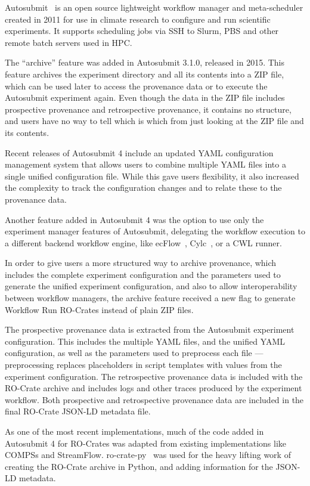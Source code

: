\documentclass[10pt,letterpaper]{article}
\begin{document}
Autosubmit~\cite{Manubens-Gil 2016} is an open source lightweight workflow manager and meta-scheduler created in 2011 for use in climate research to configure and run scientific experiments.
It supports scheduling jobs via SSH to Slurm, PBS and other remote batch servers used in HPC.

The ``archive'' feature was added in Autosubmit 3.1.0, released in 2015.
This feature archives the experiment directory and all its contents into a ZIP file, which can be used later to access the provenance data or to execute the Autosubmit experiment again.
Even though the data in the ZIP file includes prospective provenance and retrospective provenance, it contains no structure, and users have no way to tell which is which from just looking at the ZIP file and its contents.

Recent releases of Autosubmit 4 include an updated YAML configuration management system that allows users to combine multiple YAML files into a single unified configuration file.
While this gave users flexibility, it also increased the complexity to track the configuration changes and to relate these to the provenance data.

Another feature added in Autosubmit 4 was the option to use only the experiment manager features of Autosubmit, delegating the workflow execution to a different backend workflow engine, like ecFlow~\cite{Bahra 2011}, Cylc~\cite{Oliver 2023}, or a CWL runner.

In order to give users a more structured way to archive provenance, which includes the complete experiment configuration and the parameters used to generate the unified experiment configuration, and also to allow interoperability between workflow managers, the archive feature received a new flag to generate Workflow Run RO-Crates instead of plain ZIP files.

The prospective provenance data is extracted from the Autosubmit experiment configuration.
This includes the multiple YAML files, and the unified YAML configuration, as well as the parameters used to preprocess each file --- preprocessing replaces placeholders in script templates with values from the experiment configuration.
The retrospective provenance data is included with the RO-Crate archive and includes logs and other traces produced by the experiment workflow.
Both prospective and retrospective provenance data are included in the final RO-Crate JSON-LD metadata file.

As one of the most recent implementations, much of the code added in Autosubmit 4 for RO-Crates was adapted from existing implementations like COMPSs and StreamFlow.
ro-crate-py~\cite{De Geest 2022} was used for the heavy lifting work of creating the RO-Crate archive in Python, and adding information for the JSON-LD metadata.
\end{document}

